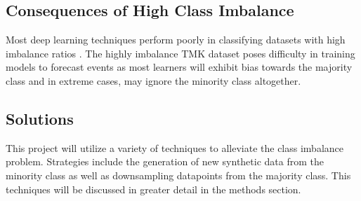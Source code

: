 \subsection{Consequences of High Class Imbalance}
Most deep learning techniques perform poorly in classifying datasets with high imbalance ratios \cite{Yan}. The highly imbalance TMK dataset poses difficulty in training models to forecast events as most learners will exhibit bias towards the majority class and in extreme cases, may ignore the minority class altogether.

\subsection{Solutions}
This project will utilize a variety of techniques to alleviate the class imbalance problem. Strategies include the generation of new synthetic data from the minority class as well as downsampling datapoints from the majority class. This techniques will be discussed in greater detail in the methods section.